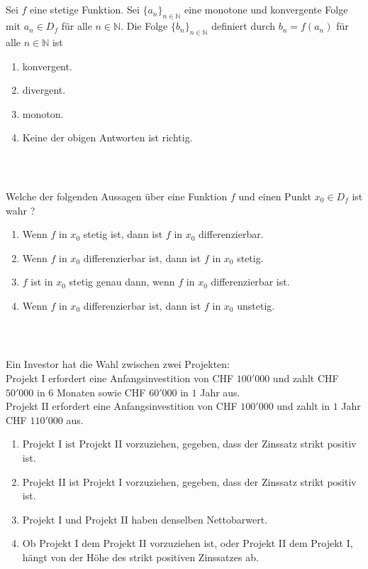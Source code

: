 \subsection*{}
Sei $ f $ eine stetige Funktion. 
Sei $ \lbrace a_n \rbrace_{n \in \mathbb{N}} $ eine monotone und konvergente Folge mit $ a_n \in D_f $ für alle $ n \in \mathbb{N} $.
Die Folge $ \lbrace b_n \rbrace_{n \in \mathbb{N}} $ definiert durch $ b_n = f(a_n) $ für alle $ n \in \mathbb{N} $ ist
\renewcommand{\labelenumi}{(\alph{enumi})}
\begin{enumerate}
\item konvergent.
\item divergent.
\item
monoton.
\item
Keine der obigen Antworten ist richtig.
\end{enumerate}
\ \\
\subsection*{}
Welche der folgenden Aussagen über eine Funktion $ f $ und einen Punkt $ x_0 \in D_f $ ist wahr ? 
\renewcommand{\labelenumi}{(\alph{enumi})}
\begin{enumerate}
\item 
Wenn $ f $ in $ x_0 $ stetig ist, dann ist $ f $ in $ x_0 $ differenzierbar.
\item 
Wenn $ f $ in $ x_0 $ differenzierbar ist, dann ist $ f $ in $ x_0 $ stetig.
\item 
$ f $ ist in $ x_0 $ stetig genau dann, wenn $ f $ in $ x_0 $ differenzierbar ist.
\item
Wenn $ f $ in $ x_0 $ differenzierbar ist, dann ist $ f $ in $ x_0 $ unstetig.
\end{enumerate}
\ \\
\subsection*{}
Ein Investor hat die Wahl zwischen zwei Projekten:\\
Projekt I erfordert eine Anfangsinvestition von CHF $ 100'000  $ und zahlt CHF $ 50'000 $ in $ 6 $ Monaten sowie CHF $ 60'000 $ in $ 1 $ Jahr aus. \\
Projekt II erfordert eine Anfangsinvestition von CHF $ 100'000 $ und zahlt in $ 1 $ Jahr CHF $ 110'000 $ aus.
\renewcommand{\labelenumi}{(\alph{enumi})}
\begin{enumerate}
\item 
Projekt I ist Projekt II vorzuziehen, gegeben, dass der Zinssatz strikt positiv ist.
\item
Projekt II ist Projekt I vorzuziehen, gegeben, dass der Zinssatz strikt positiv ist.
\item
Projekt I und Projekt II haben denselben Nettobarwert.
\item
Ob Projekt I dem Projekt II vorzuziehen ist, oder Projekt II dem Projekt I, hängt von der Höhe des strikt positiven Zinssatzes ab.
\end{enumerate}
\ \\

